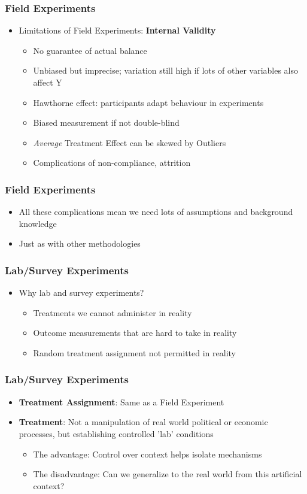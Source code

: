 \documentclass[xcolor=x11names,compress]{beamer}\usepackage[]{graphicx}\usepackage[]{color}
\renewcommand{\(}{\begin{columns}}
\renewcommand{\)}{\end{columns}}
\newcommand{\<}[1]{\begin{column}{#1}}
\renewcommand{\>}{\end{column}}
\begin{document}
\begin{frame}
\frametitle{Field Experiments}
\begin{itemize}
\item Limitations of Field Experiments: \textbf{Internal Validity}
\pause
\begin{itemize}
\item No guarantee of actual balance
\item Unbiased but imprecise; variation still high if lots of other variables also affect Y
\item Hawthorne effect: participants adapt behaviour in experiments
\item Biased measurement if not double-blind
\item \textit{Average} Treatment Effect can be skewed by Outliers
\item Complications of non-compliance, attrition
\end{itemize}
\end{itemize}
\end{frame}

\begin{frame}
\frametitle{Field Experiments}
\begin{itemize}
\item All these complications mean we need lots of assumptions and background knowledge
\item Just as with other methodologies
\end{itemize}
\end{frame}

\begin{frame}
\frametitle{Lab/Survey Experiments}
\begin{itemize}
\item Why lab and survey experiments?
\pause
\begin{itemize}
\item Treatments we cannot administer in reality
\item Outcome measurements that are hard to take in reality
\item Random treatment assignment not permitted in reality
\end{itemize}
\end{itemize}
\end{frame}

\begin{frame}
\frametitle{Lab/Survey Experiments}
\begin{itemize}
\item \textbf{Treatment Assignment}: Same as a Field Experiment
\pause
\item \textbf{Treatment}: Not a manipulation of real world political or economic processes, but establishing controlled 'lab' conditions
\pause
\begin{itemize}
\item The advantage: Control over context helps isolate mechanisms
\item The disadvantage: Can we generalize to the real world from this artificial context?
\end{itemize}
\end{itemize}
\end{frame}
\end{document}
